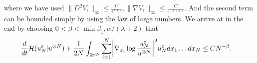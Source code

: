 where we have used $\|D^2 V_{\epsilon}\|_{\infty} \le  \frac{C}{\epsilon^{\lambda+2}},\|\nabla V_{\epsilon}\|_{\infty} \le  \frac{C}{\epsilon ^{(\lambda+1)} }$.
And the second term can be bounded simply by using the law of large numbers.
We arrive at in the end by choosing $0<\beta<\min {\beta_1,\alpha/(\lambda+2)}$ that
\begin{align*}
&\frac{d}{dt} \mathcal{H}(u_{N}^\epsilon | u^{\otimes N}  ) +\frac{1}{2N} \int_{\mathbb{R}^{dN} } \sum_{i=1}^{N} \abs*{\nabla_{x_i} \log  \frac{u_N^\epsilon}{u^{\otimes N} }}^2 u_N^\epsilon  dx_{1}\ldots dx_N\leq CN^{-\beta}
.\end{align*}
